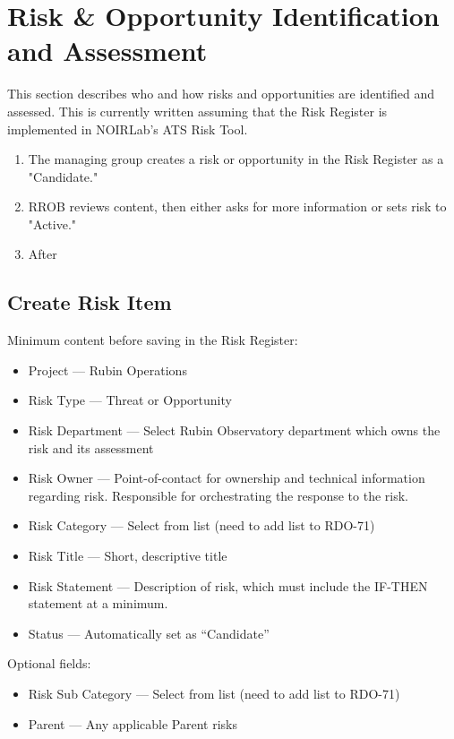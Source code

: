 \section{Risk \& Opportunity Identification and Assessment}
\label{sec:id-assess}

This section describes who and how risks and opportunities are identified and assessed.
This is currently written assuming that the Risk Register is implemented in NOIRLab's ATS Risk Tool.

\begin{enumerate}
	\item The managing group creates a risk or opportunity in the Risk Register as a "Candidate."
	\item RROB reviews content, then either asks for more information or sets risk to "Active."
	\item After
\end{enumerate}

\subsection{Create Risk Item}

Minimum content before saving in the Risk Register:
\begin{itemize}
	\item Project --- Rubin Operations
	\item Risk Type --- Threat or Opportunity
	\item Risk Department --- Select Rubin Observatory department which owns the risk and its assessment
	\item Risk Owner --- Point-of-contact for ownership and technical information regarding risk. Responsible for orchestrating the response to the risk.
	\item Risk Category --- Select from list (need to add list to RDO-71)
	\item Risk Title --- Short, descriptive title
	\item Risk Statement --- Description of risk, which must include the IF-THEN statement at a minimum.
	\item Status --- Automatically set as ``Candidate''
\end{itemize}

Optional fields:
\begin{itemize}
	\item Risk Sub Category --- Select from list (need to add list to RDO-71)
	\item Parent --- Any applicable Parent risks
\end{itemize}

